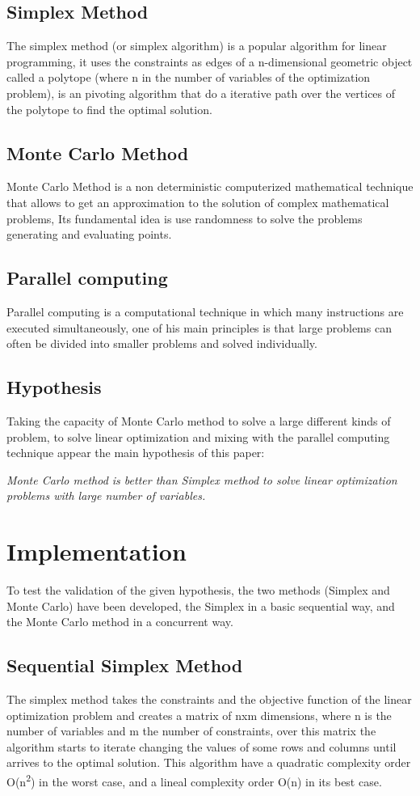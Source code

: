 \documentclass[runningheads]{llncs}
\begin{document}
\subsection{Simplex Method}
The simplex method (or simplex algorithm) is a popular algorithm for linear programming, it uses the constraints as edges of a n-dimensional geometric object called a polytope (where n in the number of variables of the optimization problem), is an pivoting algorithm that do a iterative path over the vertices of the polytope to find the optimal solution.

\subsection{Monte Carlo Method}
Monte Carlo Method is a non deterministic computerized mathematical technique that allows to get an approximation to the solution of complex mathematical problems, Its fundamental idea is use randomness to solve the problems generating and evaluating points. 

\subsection{Parallel computing}
Parallel computing is a computational technique in which many instructions are executed simultaneously, one of his main principles is that large problems can often be divided into smaller problems and solved individually.

\subsection{Hypothesis}
Taking the capacity of Monte Carlo method to solve a large different kinds of problem, to solve linear optimization and mixing with the parallel computing technique appear the main hypothesis of this paper:

\textit{Monte Carlo method is better than Simplex method to solve linear optimization problems with large number of variables.}

\section{Implementation}
To test the validation of the given hypothesis, the two methods (Simplex and Monte Carlo) have been developed, the Simplex in a basic sequential way, and the Monte Carlo method in a concurrent way.

\subsection{Sequential Simplex Method}
The simplex method takes the constraints and the objective function of the linear optimization problem and creates a matrix of nxm dimensions, where n is the number of variables and m the number of constraints, over this matrix the algorithm starts to iterate changing the values of some rows and columns until arrives to the optimal solution.
This algorithm have a quadratic complexity order O(n\textsuperscript{2}) in the worst case, and a lineal complexity order O(n) in its best case.
\end{document}
